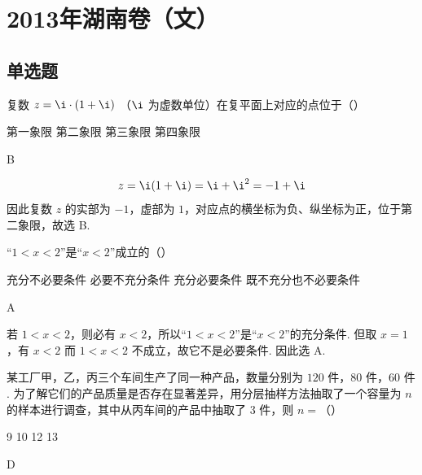 \chapter{2013年湖南卷（文）}

\section{单选题}

\begin{problem}
复数 \(z = \i \cdot (1 + \i)\) （\(\i\) 为虚数单位）在复平面上对应的点位于（\quad）

\choices
    {第一象限}
    {第二象限}
    {第三象限}
    {第四象限}
\end{problem}

\begin{answer}
B
\end{answer}

\begin{solution}
\[
z=\i(1+\i)=\i+\i^2=-1+\i
\]
因此复数 \(z\) 的实部为 \(-1\)，虚部为 \(1\)，对应点的横坐标为负、纵坐标为正，位于第二象限，故选 B.
\end{solution}

\begin{problem}
“\(1 < x < 2\)”是“\(x < 2\)”成立的（\quad）

\choices
    {充分不必要条件}
    {必要不充分条件}
    {充分必要条件}
    {既不充分也不必要条件}
\end{problem}

\begin{answer}
A
\end{answer}

\begin{solution}
若 \(1<x<2\)，则必有 \(x<2\)，所以“\(1<x<2\)”是“\(x<2\)”的充分条件.
但取 \(x=1\)，有 \(x<2\) 而 \(1<x<2\) 不成立，故它不是必要条件.
因此选 A.
\end{solution}

\begin{problem}
某工厂甲，乙，丙三个车间生产了同一种产品，数量分别为 \(120\text{ 件}\)，\(80\text{ 件}\)，\(60\text{ 件}\). 为了解它们的产品质量是否存在显著差异，用分层抽样方法抽取了一个容量为 \(n\) 的样本进行调查，其中从丙车间的产品中抽取了 \(3\text{ 件}\)，则 \(n=\)（\quad）

\choices
    {9}
    {10}
    {12}
    {13}
\end{problem}

\begin{answer}
D
\end{answer}

